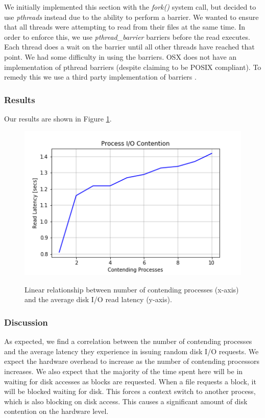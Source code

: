 \documentclass[sigconf]{acmart}
\begin{document}
We initially implemented this section with the \textit{fork()} system call, but decided to use \textit{pthreads} instead due to the ability to perform a barrier. We wanted to ensure that all threads were attempting to read from their files at the same time. In order to enforce this, we use \textit{pthread\_barrier} barriers before the read executes. Each thread does a wait on the barrier until all other threads have reached that point. We had some difficulty in using the barriers. OSX does not have an implementation of pthread barriers (despite claiming to be POSIX compliant). To remedy this we use a third party implementation of barriers \cite{armea_2013}.

\subsubsection{Results}
Our results are shown in Figure \ref{processcontention}.

\begin{figure}[h!]
\caption{Linear relationship between number of contending processes (x-axis) and the average disk I/O read latency (y-axis).}
\includegraphics[scale=0.6]{images/process_contention.png}
\label{processcontention}
\end{figure}

\subsubsection{Discussion}
As expected, we find a correlation between the number of contending processes and the average latency they experience in issuing random disk I/O requests. We expect the hardware overhead to increase as the number of contending processors increases. We also expect that the majority of the time spent here will be in waiting for disk accesses as blocks are requested. When a file requests a block, it will be blocked waiting for disk. This forces a context switch to another process, which is also blocking on disk access. This causes a significant amount of disk contention on the hardware level.
\end{document}

